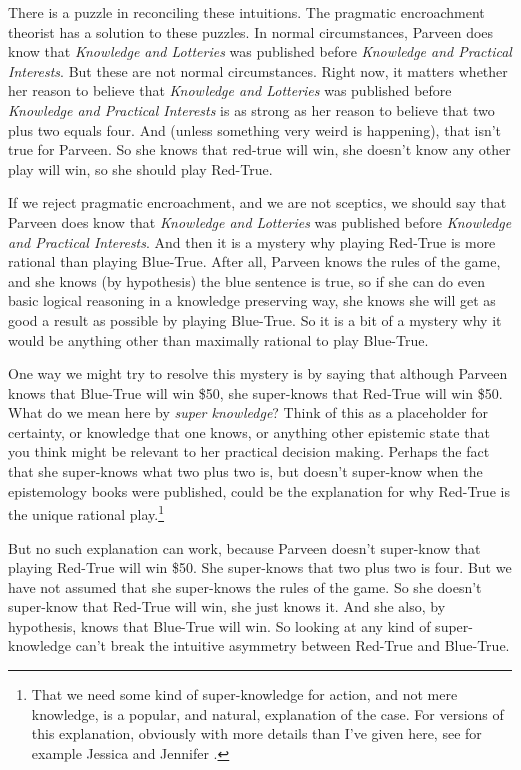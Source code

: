There is a puzzle in reconciling these intuitions. The pragmatic encroachment theorist has a solution to these puzzles. In normal circumstances, Parveen does know that \emph{Knowledge and Lotteries} was published before \emph{Knowledge and Practical Interests}. But these are not normal circumstances. Right now, it matters whether her reason to believe that \emph{Knowledge and Lotteries} was published before \emph{Knowledge and Practical Interests} is as strong as her reason to believe that two plus two equals four. And (unless something very weird is happening), that isn't true for Parveen. So she knows that red-true will win, she doesn't know any other play will win, so she should play Red-True.

If we reject pragmatic encroachment, and we are not sceptics, we should say that Parveen does know that \emph{Knowledge and Lotteries} was published before \emph{Knowledge and Practical Interests}. And then it is a mystery why playing Red-True is more rational than playing Blue-True. After all, Parveen knows the rules of the game, and she knows (by hypothesis) the blue sentence is true, so if she can do even basic logical reasoning in a knowledge preserving way, she knows she will get as good a result as possible by playing Blue-True. So it is a bit of a mystery why it would be anything other than maximally rational to play Blue-True.

One way we might try to resolve this mystery is by saying that although Parveen knows that Blue-True will win \$50, she super-knows that Red-True will win \$50. What do we mean here by \emph{super knowledge}? Think of this as a placeholder for certainty, or knowledge that one knows, or anything other epistemic state that you think might be relevant to her practical decision making. Perhaps the fact that she super-knows what two plus two is, but doesn't super-know when the epistemology books were published, could be the explanation for why Red-True is the unique rational play.\footnote{That we need some kind of super-knowledge for action, and not mere knowledge, is a popular, and natural, explanation of the case. For versions of this explanation, obviously with more details than I've given here, see for example Jessica \citet{Brown2008} and Jennifer \citet{Lackey2010}.}

But no such explanation can work, because Parveen doesn't super-know that playing Red-True will win \$50. She super-knows that two plus two is four. But we have not assumed that she super-knows the rules of the game. So she doesn't super-know that Red-True will win, she just knows it. And she also, by hypothesis, knows that Blue-True will win. So looking at any kind of super-knowledge can't break the intuitive asymmetry between Red-True and Blue-True.


